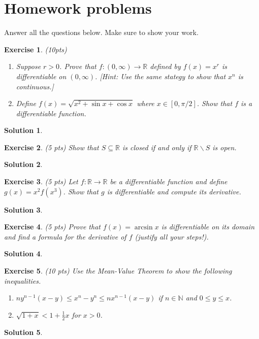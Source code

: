 \documentclass[12pt]{article}
\newcommand{\bR}{\mathbb{R}}
\newcommand{\bN}{\mathbb{N}}
\newcommand{\ra}{\rightarrow}
\theoremstyle{plain}
\newtheorem{exer}{\textbf{Exercise}}}
\theoremstyle{plain}
\newtheorem*{sol}{\textbf{Solution}}}
\begin{document}
\section{Homework problems}
Answer all the questions below. Make sure to show your work.

\begin{exer}
(10pts)
\begin{enumerate}[label=\textbf{\alph*)}]
\item Suppose $r > 0$. Prove that $f : (0, \infty ) \ra \bR$ defined by $f(x) = x^r$ is differentiable on $(0, \infty )$. [Hint: Use the same stategy to show that $x^n$ is continuous.]
\item Define $f(x) = \sqrt{x^2 + \sin x + \cos x}$ where $x \in [0, \pi/2 ]$. Show that $f$ is a differentiable function.
\end{enumerate}
\end{exer}
\begin{sol}

\end{sol}

\begin{exer}
(5 pts)
Show that $S \subseteq \bR$ is closed if and only if $\bR \backslash S$ is open.
\end{exer}
\begin{sol}

\end{sol}

\begin{exer}
(5 pts)
Let $f : \bR \ra \bR$ be a differentiable function and define $g(x) = x^2 f(x^3)$. Show that $g$ is differentiable and compute its derivative.
\end{exer}
\begin{sol}

\end{sol}

\begin{exer}
(5 pts)
Prove that $f(x) = \arcsin x$ is differentiable on its domain and find a formula for the derivative of $f$ (justify all your steps!).
\end{exer}
\begin{sol}

\end{sol}

\begin{exer}
(10 pts)
Use the Mean-Value Theorem to show the following inequalities.
	\begin{enumerate}[label=\textbf{\alph*)}]
	\item $n y^{n-1} (x - y) \leq x^n - y^n \leq n x^{n-1} (x - y)$ if $n \in \bN$ and $0 \leq y \leq x$.
	\item $\sqrt{1 + x} < 1 + \frac{1}{2} x$ for $x > 0$.
	\end{enumerate}
\end{exer}
\begin{sol}

\end{sol}
\end{document}
